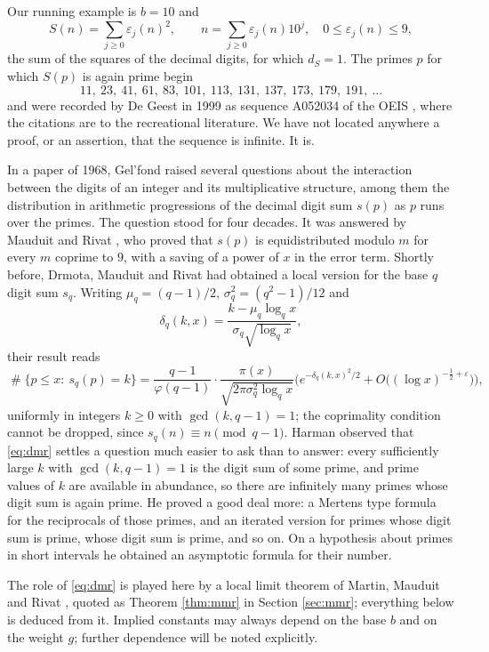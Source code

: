 \documentclass[11pt,reqno]{amsart}
\theoremstyle{plain}
\theoremstyle{definition}
\DeclareMathOperator{\Card}{\#}
\begin{document}
Our running example is $b=10$ and
\[
S(n)=\sum_{j\ge 0}\varepsilon_j(n)^2,\qquad n=\sum_{j\ge 0}\varepsilon_j(n)10^{j},\quad 0\le \varepsilon_j(n)\le 9 ,
\]
the sum of the squares of the decimal digits, for which $d_S=1$. The primes $p$ for which $S(p)$ is again prime begin
\[
11,\ 23,\ 41,\ 61,\ 83,\ 101,\ 113,\ 131,\ 137,\ 173,\ 179,\ 191,\ \dots
\]
and were recorded by De Geest in 1999 as sequence A052034 of the OEIS \cite{oeis}, where the citations are to the recreational literature. We have not located anywhere a proof, or an assertion, that the sequence is infinite. It is.

In a paper of 1968, Gel'fond \cite{gelfond} raised several questions about the interaction between the digits of an integer and its multiplicative structure, among them the distribution in arithmetic progressions of the decimal digit sum $s(p)$ as $p$ runs over the primes. The question stood for four decades. It was answered by Mauduit and Rivat \cite{mauduitrivat}, who proved that $s(p)$ is equidistributed modulo $m$ for every $m$ coprime to $9$, with a saving of a power of $x$ in the error term. Shortly before, Drmota, Mauduit and Rivat \cite{dmr} had obtained a local version for the base $q$ digit sum $s_q$. Writing $\mu_q=(q-1)/2$, $\sigma_q^2=(q^2-1)/12$ and
\[
\delta_q(k,x)=\frac{k-\mu_q\log_q x}{\sigma_q\sqrt{\log_q x}},
\]
their result reads
\begin{equation}\label{eq:dmr}
\Card\{p\le x:\ s_q(p)=k\}=\frac{q-1}{\varphi(q-1)}\cdot\frac{\pi(x)}{\sqrt{2\pi\sigma_q^2\log_q x}}\Big(e^{-\delta_q(k,x)^2/2}+O\big((\log x)^{-\frac12+\varepsilon}\big)\Big),
\end{equation}
uniformly in integers $k\ge 0$ with $\gcd(k,q-1)=1$; the coprimality condition cannot be dropped, since $s_q(n)\equiv n \pmod{q-1}$. Harman \cite{harman} observed that \eqref{eq:dmr} settles a question much easier to ask than to answer: every sufficiently large $k$ with $\gcd(k,q-1)=1$ is the digit sum of some prime, and prime values of $k$ are available in abundance, so there are infinitely many primes whose digit sum is again prime. He proved a good deal more: a Mertens type formula for the reciprocals of those primes, and an iterated version for primes whose digit sum is prime, whose digit sum is prime, and so on. On a hypothesis about primes in short intervals he obtained an asymptotic formula for their number.

The role of \eqref{eq:dmr} is played here by a local limit theorem of Martin, Mauduit and Rivat \cite{mmr2019}, quoted as Theorem \ref{thm:mmr} in Section \ref{sec:mmr}; everything below is deduced from it. Implied constants may always depend on the base $b$ and on the weight $g$; further dependence will be noted explicitly.
\end{document}
